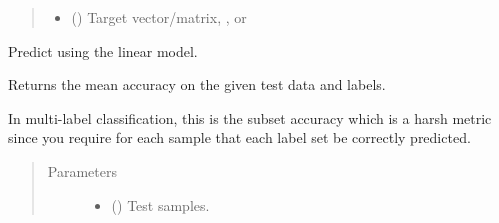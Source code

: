\documentclass[letterpaper,10pt,english]{sphinxmanual}
\begin{document}
{\begin{fulllineitems}
\begin{fulllineitems}
\begin{quote}
\begin{description}
\begin{itemize}
\item {} 
 () \textendash{} Target vector/matrix, ,
or 

\end{itemize}

\end{description}\end{quote}

\end{fulllineitems}


\begin{fulllineitems}
\label{\detokenize{api_reference:group_lasso.LogisticGroupLasso.predict}}
Predict using the linear model.

\end{fulllineitems}


\begin{fulllineitems}
\label{\detokenize{api_reference:group_lasso.LogisticGroupLasso.score}}
Returns the mean accuracy on the given test data and labels.

In multi-label classification, this is the subset accuracy
which is a harsh metric since you require for each sample that
each label set be correctly predicted.
\begin{quote}\begin{description}
\item[{Parameters}] \leavevmode\begin{itemize}
\item {} 
 (\sphinxstyleliteralemphasis{\sphinxupquote{, }}\sphinxstyleliteralemphasis{\sphinxupquote{ (}}\sphinxstyleliteralemphasis{\sphinxupquote{, }}\sphinxstyleliteralemphasis{\sphinxupquote{)}}) \textendash{} Test samples.


\end{itemize}
\end{description}
\end{quote}
\end{fulllineitems}
\end{fulllineitems}}
\end{document}
